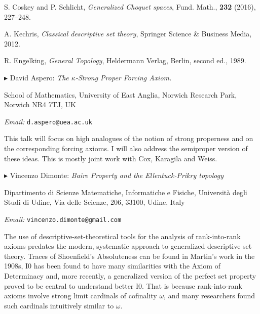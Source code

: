 \documentclass[a4paper]{amsart}
\theoremstyle{remark}
\newcommand{\vsp}{\vspace{20pt}}
\begin{document}
\begin{thebibliography}{100}

 S. Coskey and P. Schlicht, \emph{Generalized Choquet spaces}, Fund. Math., \textbf{232} (2016), 227--248.

 A. Kechris, \emph{Classical descriptive set theory}, Springer Science \& Business Media, 2012.
 
 R. Engelking, \emph{General Topology}, Heldermann Verlag, Berlin, second ed., 1989.
 
\end{thebibliography}









\vspace{30pt}


\noindent 
$\blacktriangleright$ David Aspero: \emph{The $\kappa$-Strong Proper Forcing Axiom.} 

\noindent 
School of Mathematics, 
University of East Anglia, 
Norwich Research Park, 
Norwich NR4 7TJ, 
UK 

\noindent 
\emph{Email:} \texttt{d.aspero@uea.ac.uk}

This talk will focus on high analogues of the notion of strong properness and on the corresponding forcing axioms. I will also address the semiproper version of these ideas. This is mostly joint work with Cox, Karagila and Weiss.






\vsp 

\newpage

\noindent 
$\blacktriangleright$ Vincenzo Dimonte: \emph{Baire Property and the Ellentuck-Prikry topology} 

\noindent 
Dipartimento di Scienze Matematiche, Informatiche e Fisiche, 
Universit\`a degli Studi di Udine, 
Via delle Scienze, 206, 
33100, Udine, Italy 

\noindent 
\emph{Email:} \texttt{vincenzo.dimonte@gmail.com}

The use of descriptive-set-theoretical tools for the analysis of rank-into-rank axioms predates the modern, systematic approach to generalized descriptive set theory. Traces of Shoenfield's Absoluteness can be found in Martin's work in the 1908s, I0 has been found to have many similarities with the Axiom of Determinacy and, more recently, a generalized version of the perfect set property proved to be central to understand better I0. That is because rank-into-rank axioms involve strong limit cardinals of cofinality $\omega$, and many researchers found such cardinals intuitively similar to $\omega$.
\end{document}
